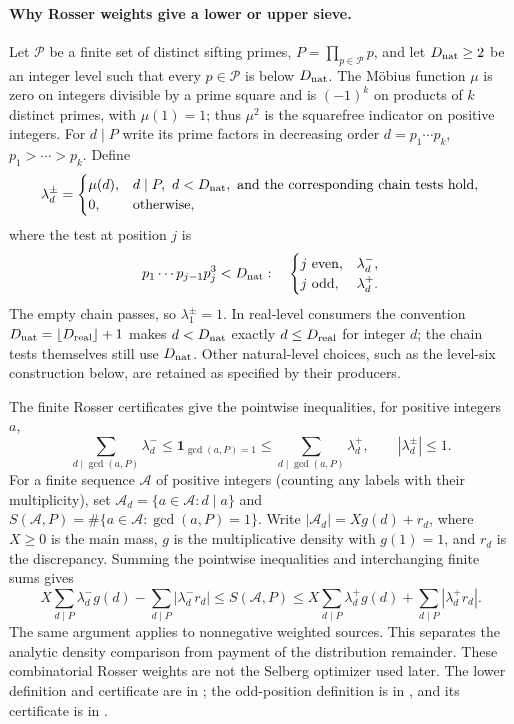 \paragraph{Why Rosser weights give a lower or upper sieve.}
Let $\mathcal P$ be a finite set of distinct sifting primes,
$P=\prod_{p\in\mathcal P}p$, and let $D_{\rm nat}\ge2$ be an integer level
such that every $p\in\mathcal P$ is below $D_{\rm nat}$.
The M\"obius function $\mu$ is zero on integers divisible by a prime square
and is $(-1)^k$ on products of $k$ distinct primes, with $\mu(1)=1$;
thus $\mu^2$ is the squarefree indicator on positive integers.
For $d\mid P$ write its prime factors in decreasing order
$d=p_1\cdots p_k$, $p_1>\cdots>p_k$. Define
\[
 \lambda_d^{\pm}=
 \begin{cases}
 \mu(d),&d\mid P,\ d<D_{\rm nat},\ \text{and the corresponding chain tests hold},\\
 0,&\text{otherwise},
 \end{cases}
\]
where the test at position $j$ is
\[
 p_1\cdots p_{j-1}p_j^3<D_{\rm nat}:
 \quad\begin{cases}
 j\text{ even},&\lambda_d^-,\\
 j\text{ odd},&\lambda_d^+.
 \end{cases}
\]
The empty chain passes, so $\lambda_1^\pm=1$.
In real-level consumers the convention $D_{\rm nat}=\lfloor D_{\rm real}\rfloor+1$
makes $d<D_{\rm nat}$ exactly $d\le D_{\rm real}$ for integer $d$;
the chain tests themselves still use $D_{\rm nat}$.
Other natural-level choices, such as the level-six construction below,
are retained as specified by their producers.

The finite Rosser certificates give the pointwise inequalities, for positive
integers $a$,
\[
 \sum_{d\mid\gcd(a,P)}\lambda_d^-
 \le \mathbf1_{\gcd(a,P)=1}
 \le \sum_{d\mid\gcd(a,P)}\lambda_d^+,
 \qquad |\lambda_d^\pm|\le1.
\]
For a finite sequence $\mathcal A$ of positive integers (counting any labels
with their multiplicity), set
$\mathcal A_d=\{a\in\mathcal A:d\mid a\}$ and
$S(\mathcal A,P)=\#\{a\in\mathcal A:\gcd(a,P)=1\}$.
Write $|\mathcal A_d|=Xg(d)+r_d$, where $X\ge0$ is the main mass,
$g$ is the multiplicative density with $g(1)=1$, and $r_d$ is the discrepancy.
Summing the pointwise inequalities and interchanging finite sums gives
\[
 X\sum_{d\mid P}\lambda_d^-g(d)-\sum_{d\mid P}|\lambda_d^-r_d|
 \le S(\mathcal A,P)\le
 X\sum_{d\mid P}\lambda_d^+g(d)+\sum_{d\mid P}|\lambda_d^+r_d|.
\]
The same argument applies to nonnegative weighted sources. This separates
the analytic density comparison from payment of the distribution remainder.
These combinatorial Rosser weights are not the Selberg optimizer used later.
The lower definition and certificate are in
;
the odd-position definition is in
,
and its certificate is in
.

